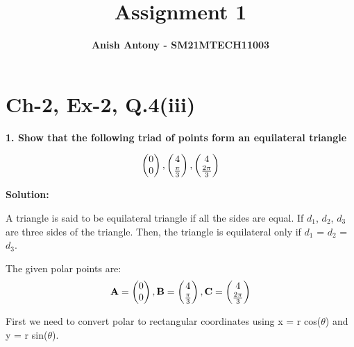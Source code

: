 \documentclass[journal,12pt,twocolumn]{IEEEtran}
\title{\textbf{\Huge Assignment 1}}
\author{\textbf{\Large Anish Antony - SM21MTECH11003}}
\begin{document}
\providecommand{\mbf}{\mathbf}
\providecommand{\norm}[1]{\left\lVert#1\right\rVert}
\newcommand{\myvec}[1]{\ensuremath{\begin{pmatrix}#1\end{pmatrix}}}
\let\vec\mathbf

\maketitle



\section*{Ch-2, Ex-2, Q.4(iii)}
\vspace{0.35cm}



\textbf{1. Show that the following triad of points form an equilateral triangle}

\vspace{0.1cm}

\begin{align}
\myvec{0\\0}, \myvec{4\\$$\frac{\pi}{3}$$},
\myvec{4\\$$\frac{2\pi}{3}$$}
\end{align}

\vspace{0.2cm}



\textbf{Solution:}  

\vspace{0.3cm}
A triangle is said to be equilateral triangle if all the sides are equal. If $d_1$, $d_2$, $d_3$ are three sides of the triangle. Then, the triangle is equilateral only if $d_1$ = $d_2$ = $d_3$.
\vspace{0.3cm} 

The given polar points are:
\begin{align}
\vec{A} = \myvec{0\\0}, \vec{B} =\myvec{4\\$$\frac{\pi}{3}$$},
\vec{C} =\myvec{4\\$$\frac{2\pi}{3}$$}
\end{align}

First we need to convert polar to rectangular coordinates using x = r cos($\theta$) and y = r sin($\theta$). 

\vspace{0.3cm}
\end{document}
